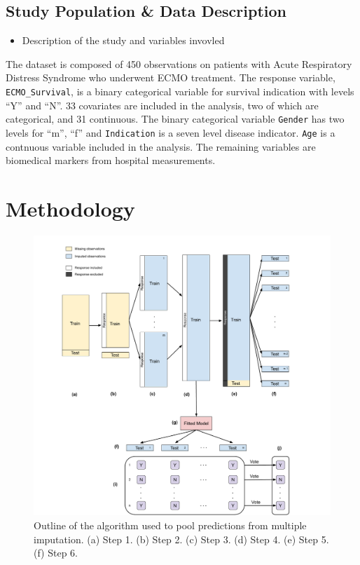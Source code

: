 \documentclass[12pt,]{article}
\providecommand{\tightlist}{%
  \setlength{\itemsep}{0pt}\setlength{\parskip}{0pt}}
\begin{document}
\subsection{Study Population \& Data
Description}\label{study-population-data-description}

\begin{itemize}
\tightlist
\item
  Description of the study and variables invovled
\end{itemize}

The dataset is composed of 450 observations on patients with Acute
Respiratory Distress Syndrome who underwent ECMO treatment. The response
variable, \texttt{ECMO\_Survival}, is a binary categorical variable for
survival indication with levels ``Y'' and ``N''. 33 covariates are
included in the analysis, two of which are categorical, and 31
continuous. The binary categorical variable \texttt{Gender} has two
levels for ``m'', ``f'' and \texttt{Indication} is a seven level disease
indicator. \texttt{Age} is a contnuous variable included in the
analysis. The remaining variables are biomedical markers from hospital
measurements.

\newpage

\section{Methodology}\label{methodology}

\begin{figure}[H]

{\centering \includegraphics[width=1\linewidth]{images/ensemble-imputation} 

}

\caption{\label{fig:ensemble-imputation}Outline of the algorithm used to pool predictions from multiple imputation.  (a) Step 1. (b) Step 2. (c) Step 3. (d) Step 4.  (e) Step 5.  (f) Step 6.}\label{fig:ensemble-imputation}
\end{figure}
\end{document}
